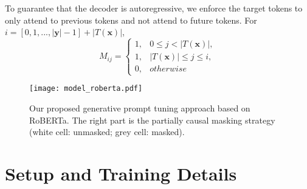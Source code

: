 \documentclass[11pt]{article}
\begin{document}
To guarantee that the decoder is autoregressive, we enforce the target tokens to only attend to previous tokens and not attend to future tokens. 
For $i =[0, 1, ..., |\boldsymbol{y}|-1] + |T(\boldsymbol{x})|$, 
\begin{equation*}
	M_{ij}=
	\begin{cases}
		1, & 0\le j< |T(\boldsymbol{x})|,\\
		1, & |T(\boldsymbol{x})| \le j \le i, \\
		0, & otherwise
	\end{cases}
\end{equation*}
\begin{table}
	\centering
	\caption{Statistics of datasets used.}
	\label{data}
\end{table}

\begin{figure*}[t]
\centering
	\texttt{[image: model\_roberta.pdf]}
	\caption{Our proposed generative prompt tuning approach based on RoBERTa. The right part is the partially causal masking strategy (white cell: unmasked; grey cell: masked).}
	\label{model_roberta} 
	
\end{figure*}

\section{Setup and Training Details}\label{C}
\end{document}

